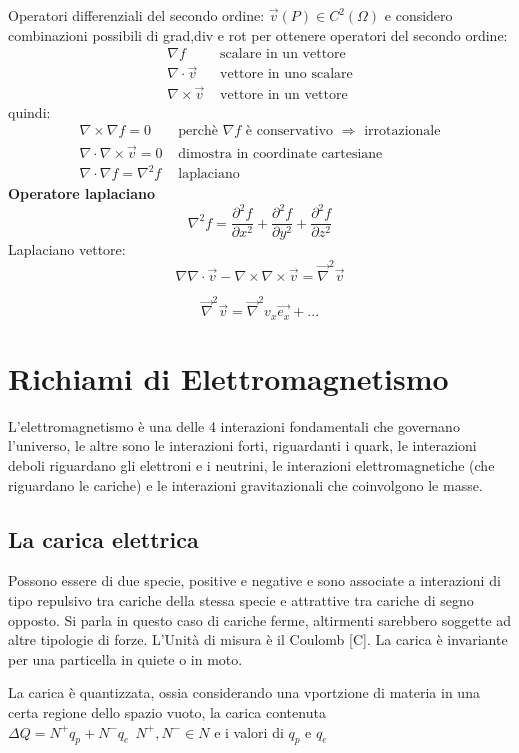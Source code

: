 Operatori differenziali del secondo ordine:
$ \vec{v}(P) \in C^2(\Omega) $ e considero combinazioni possibili di grad,div e rot per ottenere
operatori del secondo ordine:
\begin{align*}
\nabla f &\text{ scalare in un vettore}\\
\nabla\cdot\vec{v} &\text{ vettore in uno scalare}\\
\nabla\times\vec{v} &\text{ vettore in un vettore}
\end{align*}
quindi:
\begin{align*}
\nabla\times\nabla f = 0 &\text{ perchè $\nabla f$ è conservativo $\Rightarrow$ irrotazionale}\\
\nabla\cdot\nabla\times\vec{v} = 0 &\text{ dimostra in coordinate cartesiane}\\
\nabla\cdot \nabla f = \nabla^2 f &\text{ laplaciano}
\end{align*}
\textbf{Operatore laplaciano}
$$
\nabla^2 f = \frac{\partial^2f}{\partial x^2} + \frac{\partial^2f}{\partial y^2} + \frac{\partial^2f}{\partial z^2}
$$
Laplaciano vettore:
$$
\nabla\nabla\cdot\vec{v} - \nabla\times\nabla\times\vec{v} = \vec{\nabla}^2\vec{v}
$$

$$
\vec{\nabla}^2\vec{v} = \vec{\nabla}^2v_x\vec{e_x} + ...
$$

\section{Richiami di Elettromagnetismo}
L'elettromagnetismo è una delle 4 interazioni fondamentali che governano l'universo, le altre
sono le interazioni forti, riguardanti i quark, le interazioni deboli riguardano gli elettroni e i 
neutrini, le interazioni elettromagnetiche (che riguardano le cariche) e le interazioni gravitazionali
che coinvolgono le masse.

\subsection{La carica elettrica}
Possono essere di due specie, positive e negative e sono associate a interazioni di tipo repulsivo tra
cariche della stessa specie e attrattive tra cariche di segno opposto.
Si parla in questo caso di cariche ferme, altirmenti sarebbero soggette ad altre tipologie di forze.
L'Unità di misura è il Coulomb [\si{\coulomb}].
La carica è invariante per una particella in quiete o in moto.

La carica è quantizzata, ossia considerando una vportzione di materia in una certa regione 
dello spazio vuoto, la carica contenuta $\Delta Q = N^+q_p + N^-q_e\ \ N^+,N^- \in N$
e i valori di $q_p$ e $q_e$ 

